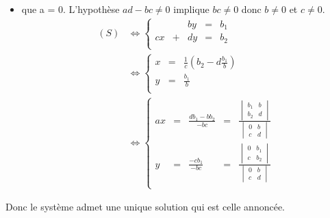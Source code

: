 \documentclass{article}
\begin{document}
\begin{question_kholle}
\begin{itemize}[label=$\bullet$ Supposons]
\begin{itemize}[label=$\bullet$ Supposons]
				\item que a = 0. L'hypothèse $ad - bc \neq 0$ implique $bc \neq 0$ donc $b \neq 0$ et $c \neq 0$.
				\begin{equation*}
					\begin{aligned}
						(S)
						&\iff \left\{
						\begin{array}{ccccc}
							&& by &=& b_1 \\
							cx &+& dy &=&  b_2 \\
						\end{array}
						\right. \\
						&\iff \left\{
						\begin{array}{ccc}
							x &=&  \frac{1}{c} \left( b_2 - d\frac{b_1}{b} \right) \\
							y &=& \frac{b_1}{b} \\
						\end{array}
						\right. \\
						&\iff \left\{
						\begin{array}{ccccc}
							ax &=& \frac{db_1 - bb_2}{- bc} &=& \frac{\begin{vmatrix}b_1&b\\b_2&d\end{vmatrix}}{\begin{vmatrix}0&b\\c&d\end{vmatrix}} \\
							y &=& \frac{- cb_1}{- bc} &=& \frac{\begin{vmatrix}0&b_1\\c&b_2\end{vmatrix}}{\begin{vmatrix}0&b\\c&d\end{vmatrix}}\\
						\end{array}
						\right.
					\end{aligned}
				\end{equation*}
			\end{itemize}
			Donc le système admet une unique solution qui est celle annoncée.
		\end{itemize}
	

\end{question_kholle}
\end{document}
